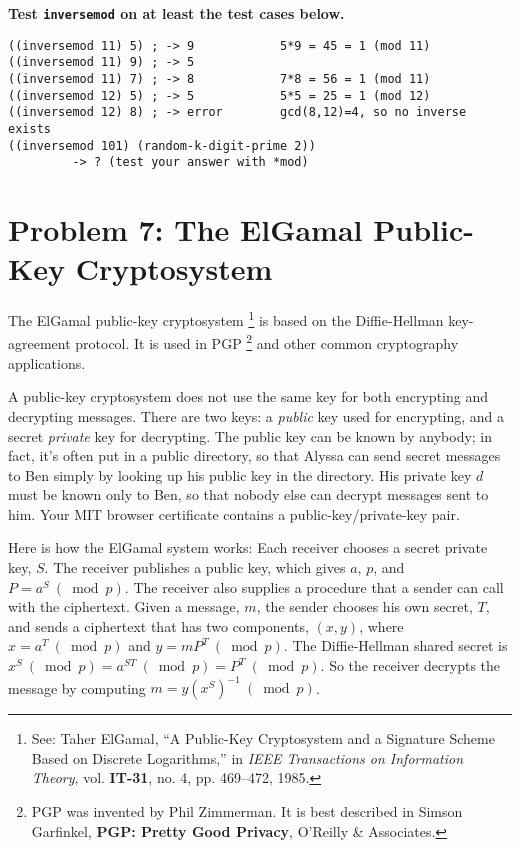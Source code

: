 {\bf Test {\tt inversemod} on at least the test cases below.}

\begin{verbatim}
((inversemod 11) 5) ; -> 9            5*9 = 45 = 1 (mod 11) 
((inversemod 11) 9) ; -> 5
((inversemod 11) 7) ; -> 8            7*8 = 56 = 1 (mod 11)
((inversemod 12) 5) ; -> 5            5*5 = 25 = 1 (mod 12)
((inversemod 12) 8) ; -> error        gcd(8,12)=4, so no inverse exists
((inversemod 101) (random-k-digit-prime 2))
         -> ? (test your answer with *mod)
\end{verbatim}


\section*{Problem 7: The ElGamal Public-Key Cryptosystem}

The ElGamal public-key cryptosystem%
\footnote{See: Taher ElGamal, 
  ``A Public-Key Cryptosystem and a Signature Scheme Based on 
    Discrete Logarithms,'' 
    in {\em IEEE Transactions on Information Theory},
    vol. {\bf IT-31}, no. 4, pp. 469--472, 1985.}
is based on the Diffie-Hellman key-agreement protocol.  It is used in PGP%
\footnote{PGP was invented by Phil Zimmerman.  It is best described in
  Simson Garfinkel, 
  {\bf PGP: Pretty Good Privacy}, O'Reilly \& Associates.}
and other common cryptography applications.

A public-key cryptosystem does not use the same key for both
encrypting and decrypting messages. There are two keys: a {\em public}
key used for encrypting, and a secret {\em private} key for
decrypting.  The public key can be known by anybody; in fact, it's
often put in a public directory, so that Alyssa can send secret
messages to Ben simply by looking up his public key in the directory.
His private key $d$ must be known only to Ben, so that nobody else can
decrypt messages sent to him.  Your MIT browser certificate contains a
public-key/private-key pair.

Here is how the ElGamal system works: Each receiver chooses a secret
private key, $S$.  The receiver publishes a public key, which gives
$a$, $p$, and $P=a^S\  (\bmod p)$.  The receiver also supplies a procedure
that a sender can call with the ciphertext.  Given a message, $m$,
the sender chooses his own secret, $T$, and sends a ciphertext that
has two components, $(x, y)$, where $x=a^T\  (\bmod p)$ and $y=m P^T
\  (\bmod p)$.  The Diffie-Hellman shared secret is $x^S\  (\bmod p)=a^{S
T}\  (\bmod p)=P^T\  (\bmod p)$.  So the receiver decrypts the message by
computing $m=y (x^S)^{-1}\  (\bmod p)$.

